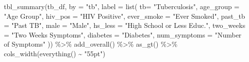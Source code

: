 \documentclass[
  letterpaper,
]{latex/krantz}
\makeatletter
\newenvironment{Shaded}{\begin{snugshade}}{\end{snugshade}}
\newcommand{\AttributeTok}[1]{\textcolor[rgb]{0.40,0.45,0.13}{#1}}
\newcommand{\FunctionTok}[1]{\textcolor[rgb]{0.28,0.35,0.67}{#1}}
\newcommand{\NormalTok}[1]{\textcolor[rgb]{0.00,0.23,0.31}{#1}}
\newcommand{\SpecialCharTok}[1]{\textcolor[rgb]{0.37,0.37,0.37}{#1}}
\newcommand{\StringTok}[1]{\textcolor[rgb]{0.13,0.47,0.30}{#1}}
\newenvironment{kframe}{%
\medskip{}
\setlength{\fboxsep}{.8em}
 \def\at@end@of@kframe{}%
 \ifinner\ifhmode%
  \def\at@end@of@kframe{\end{minipage}}%
  \begin{minipage}{\columnwidth}%
 \fi\fi%
 \def\FrameCommand##1{\hskip\@totalleftmargin \hskip-\fboxsep
 \colorbox{shadecolor}{##1}\hskip-\fboxsep
     \hskip-\linewidth \hskip-\@totalleftmargin \hskip\columnwidth}%
 \MakeFramed {\advance\hsize-\width
   \@totalleftmargin\z@ \linewidth\hsize
   \@setminipage}}%
 {\par\unskip\endMakeFramed%
 \at@end@of@kframe}
\renewenvironment{Shaded}{\begin{kframe}}{\end{kframe}}
\makeatother
\begin{document}
\begin{Shaded}
\begin{Highlighting}[]
\FunctionTok{tbl\_summary}\NormalTok{(tb\_df, }\AttributeTok{by =} \StringTok{"tb"}\NormalTok{,}
            \AttributeTok{label =} \FunctionTok{list}\NormalTok{(}
              \AttributeTok{tb=} \StringTok{"Tuberculosis"}\NormalTok{,}
              \AttributeTok{age\_group =} \StringTok{"Age Group"}\NormalTok{,}
              \AttributeTok{hiv\_pos =} \StringTok{"HIV Positive"}\NormalTok{,}
              \AttributeTok{ever\_smoke =} \StringTok{"Ever Smoked"}\NormalTok{,}
              \AttributeTok{past\_tb =} \StringTok{"Past TB"}\NormalTok{,}
              \AttributeTok{male =} \StringTok{"Male"}\NormalTok{,}
              \AttributeTok{hs\_less =} \StringTok{"High School or Less Educ."}\NormalTok{,}
              \AttributeTok{two\_weeks =} \StringTok{"Two Weeks Symptoms"}\NormalTok{,}
              \AttributeTok{diabetes =} \StringTok{"Diabetes"}\NormalTok{,}
              \AttributeTok{num\_symptoms =} \StringTok{"Number of Symptoms"}
\NormalTok{            )) }\SpecialCharTok{\%\textgreater{}\%}
  \FunctionTok{add\_overall}\NormalTok{() }\SpecialCharTok{\%\textgreater{}\%}
  \FunctionTok{as\_gt}\NormalTok{() }\SpecialCharTok{\%\textgreater{}\%}
  \FunctionTok{cols\_width}\NormalTok{(}\FunctionTok{everything}\NormalTok{() }\SpecialCharTok{\textasciitilde{}} \StringTok{"55pt"}\NormalTok{)}
\end{Highlighting}
\end{Shaded}
\end{document}
